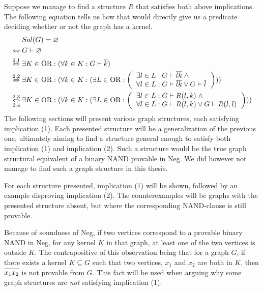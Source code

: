 Suppose we manage to find a structure $R$ that satisfies both above implications.
The following equation tells us how that would directly give us a predicate deciding whether or not the graph has a kernel.
\begin{align}
  &Sol(G) = \varnothing\\
  \Leftrightarrow\; &G \vdash \varnothing\\
  \overset{2.1}{\Leftrightarrow}\;&\exists K \in \text{OR}: (\forall  k \in K: G \vdash \ol{k})\\
  \overset{2.2}{\Leftrightarrow}\;&\exists K \in \text{OR}: (\forall  k \in K: ( \exists L \in \text{OR}:
  \left ( \begin{tabular}{l}
  $\exists l \in L: G \vdash \ol{lk} \; \wedge$\\
  $\forall l \in L: G \vdash \ol{lk} \vee G \vdash \ol{l}$
  \end{tabular} \right ) ) )\\
  \overset{2.3}{\underset{2.4}{\Leftrightarrow}}\;&\exists K \in \text{OR}: (\forall  k \in K: ( \exists L \in \text{OR}:
  \left ( \begin{tabular}{l}
  $\exists l \in L: G \vdash R(l,k) \; \wedge$\\
  $\forall l \in L: G \vdash R(l,k) \vee G \vdash R(l,l)$
  \end{tabular} \right ) ) )
\end{align}
The following sections will present various graph structures, each satisfying implication (1).
Each presented structure will be a generalization of the previous one, ultimately aiming to find a structure general enough to satisfy both implication (1) and implication (2).
Such a structure would be the true graph structural equivalent of a binary NAND provable in Neg.
We did however not manage to find such a graph structure in this thesis.

For each structure presented, implication (1) will be shown, followed by an example disproving implication (2).
The counterexamples will be graphs with the presented structure absent, but where the corresponding NAND-clause is still provable.

Because of soundness of Neg, if two vertices correspond to a provable binary NAND in Neg, for any kernel $K$ in that graph, at least one of the two vertices is outside $K$.
The contrapositive of this observation being that for a graph $G$, if there exists a kernel $K \subseteq G$ such that two vertices, $x_1$ and $x_2$ are both in $K$, then $\ol{x_1x_2}$ is not provable from $G$.
This fact will be used when arguing why some graph structures are \textit{not} satisfying implication (1).
